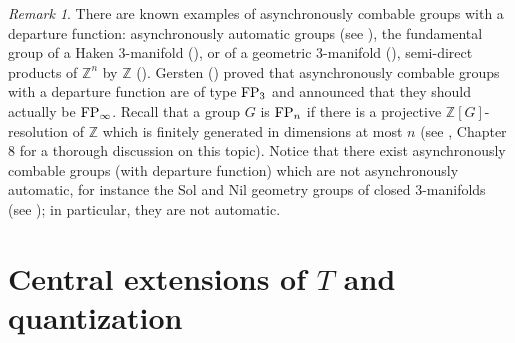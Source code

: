 \documentclass[twoside]{irmaems}
\theoremstyle{plain}
\theoremstyle{definition}
\theoremstyle{remark}
\newtheorem{remark}[theorem]{Remark}
\newcommand{\Z}{{\mathbb{Z}}}
\begin{document}
 



\begin{remark}
There are known examples of asynchronously combable groups with 
a departure function: 
asynchronously automatic groups (see \cite{ECHLPT}), 
the fundamental group of a Haken 3-manifold (\cite{Br}), 
or of a geometric 3-manifold (\cite{Br2}),
semi-direct products of $\Z^n$ by $\Z$ (\cite{Br}). 
Gersten (\cite{Ger}) proved that 
asynchronously combable groups with 
a departure function are of type ${\rm FP}_3$ and 
announced that they should actually be ${\rm FP}_{\infty}$. 
Recall that a group $G$ is ${\rm FP}_{n}$ if there is a projective 
$\Z[G]$-resolution of $\Z$ which is finitely generated in dimensions at most $n$ 
(see \cite{Geo}, Chapter 8 for a thorough discussion on this topic).  
Notice that there exist asynchronously combable groups  
(with departure function) which are 
not asynchronously automatic, for instance the {\sf Sol} and 
{\sf Nil} geometry groups  of closed 3-manifolds 
(see \cite{Bra});  in particular, they are not automatic. 
\end{remark}





\section{Central extensions of $T$ and quantization}
\end{document}
